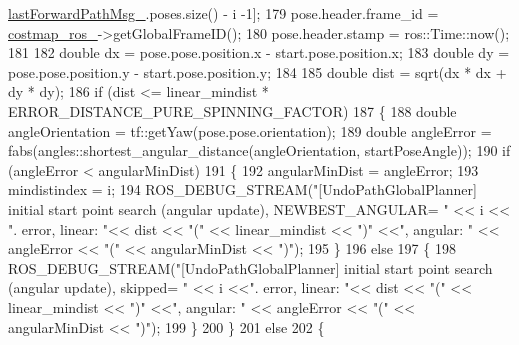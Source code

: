 \begin{DoxyCode}
      \hyperlink{classcl__move__base__z_1_1undo__path__global__planner_1_1UndoPathGlobalPlanner_a9a4a6e40f5b6cb5f77dedbc5b6170871}{lastForwardPathMsg\_}.poses.size() - i -1];
179                     pose.header.frame\_id = \hyperlink{classcl__move__base__z_1_1undo__path__global__planner_1_1UndoPathGlobalPlanner_ab63eeb465e3ae989a6edcc4d059cf8f0}{costmap\_ros\_}->getGlobalFrameID();
180                     pose.header.stamp = ros::Time::now();
181 
182                     \textcolor{keywordtype}{double} dx = pose.pose.position.x - start.pose.position.x;
183                     \textcolor{keywordtype}{double} dy = pose.pose.position.y - start.pose.position.y;
184 
185                     \textcolor{keywordtype}{double} dist = sqrt(dx * dx + dy * dy);
186                     \textcolor{keywordflow}{if} (dist <= linear\_mindist * ERROR\_DISTANCE\_PURE\_SPINNING\_FACTOR)
187                     \{
188                         \textcolor{keywordtype}{double} angleOrientation = tf::getYaw(pose.pose.orientation);
189                         \textcolor{keywordtype}{double} angleError = fabs(angles::shortest\_angular\_distance(angleOrientation, 
      startPoseAngle));
190                         \textcolor{keywordflow}{if} (angleError < angularMinDist)
191                         \{
192                             angularMinDist = angleError;
193                             mindistindex = i;
194                             ROS\_DEBUG\_STREAM(\textcolor{stringliteral}{"[UndoPathGlobalPlanner] initial start point search (angular
       update), NEWBEST\_ANGULAR= "} << i << \textcolor{stringliteral}{". error, linear: "}<<  dist << \textcolor{stringliteral}{"("} << linear\_mindist << \textcolor{stringliteral}{")"} <<\textcolor{stringliteral}{", angular:
       "} << angleError << \textcolor{stringliteral}{"("} << angularMinDist << \textcolor{stringliteral}{")"});
195                         \}
196                         \textcolor{keywordflow}{else}
197                         \{
198                             ROS\_DEBUG\_STREAM(\textcolor{stringliteral}{"[UndoPathGlobalPlanner] initial start point search (angular
       update), skipped= "} << i <<\textcolor{stringliteral}{". error, linear: "}<<  dist << \textcolor{stringliteral}{"("} << linear\_mindist << \textcolor{stringliteral}{")"} <<\textcolor{stringliteral}{", angular: "}  << 
      angleError << \textcolor{stringliteral}{"("} << angularMinDist << \textcolor{stringliteral}{")"});
199                         \}
200                     \}
201                     \textcolor{keywordflow}{else}
202                     \{

\end{DoxyCode}
